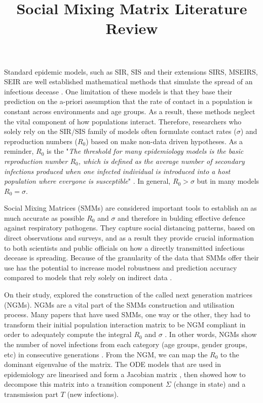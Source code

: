 \documentclass[12pt]{article}
\title{Social Mixing Matrix Literature Review}
\begin{document}
\maketitle

Standard epidemic models, such as SIR, SIS and their extensions  SIRS, MSEIRS, SEIR are well established mathematical methods that simulate the spread of an infectious decease \cite{keeling2008modeling, ma2009mathematical, li2018introduction}. One limitation of these models is that they base their prediction on the a-priori assumption that the rate of contact in a population is constant across environments and age groups. As a result, these methods neglect the vital component of how populations interact. Therefore, researchers who solely rely on the SIR/SIS family of models often formulate contact rates ($\sigma$) and reproduction numbers ($R_{0}$) based on make non-data driven hypotheses. As a reminder, $R_{0}$ is the "\textit{The threshold for many epidemiology models is the basic reproduction number $R_{0}$, which is defined as the average number of secondary infections produced when one infected individual is introduced into a host population where everyone is susceptible}" \cite[p.21]{ma2009mathematical}. In general, $R_{0}>\sigma$ but in many models $R_{0}=\sigma$. 

Social Mixing Matrices (SMMs) are considered important tools to establish an as much accurate as possible $R_{0}$ and $\sigma$ and therefore in bulding effective defence against respiratory pathogens. They capture social distancing patterns, based on direct observations and surveys, and as a result they provide crucial information to both scientists and public officials on how a directly transmitted infectious decease is spreading. Because of the granularity of the data that SMMs offer their use has the potential to increase model robustness and prediction accuracy compared to models that rely solely on indirect data \cite{Mossong:2008, Baguelin:2013}. 

On their study, \cite{Diekmann:2010} explored the construction of the called next generation matrices (NGMs). NGMs are a vital part of the SMMs construction and utilisation process. Many papers that have used SMMs, one way or the other, they had to transform their initial population interaction matrix to be NGM compliant in order to adequately compute the integral $R_{0}$ and $\sigma$ \cite{Mossong:2008, Fumanelli:2012, Klepac2020}. In other words, NGMs show the number of novel infections from each category (age groups, gender groups, etc) in consecutive generations \cite[p.874]{Diekmann:2010}. From the NGM, we can map the $R_{0}$ to the dominant eigenvalue of the matrix. The ODE models that are used in epidemiology are linearised and form a Jacobian matrix \cite[Section 2.1.2]{keeling2008modeling}, then \cite{Diekmann:2010} showed how to decompose this matrix into a transition component $\Sigma$ (change in state) and a transmission part $T$ (new infections). 
\end{document}
